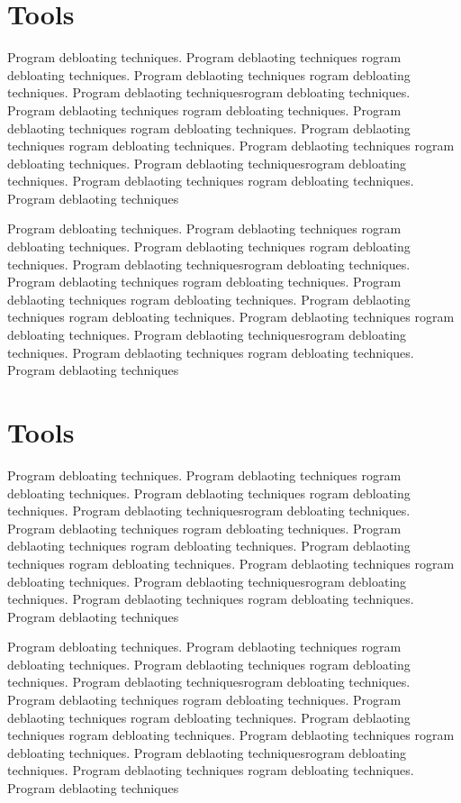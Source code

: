 \documentclass{relatorio}
\begin{document}
\section{Tools}%
\label{Tools}

Program debloating techniques. Program deblaoting techniques rogram debloating techniques. Program deblaoting techniques
rogram debloating techniques. Program deblaoting techniquesrogram debloating techniques. Program deblaoting techniques
rogram debloating techniques. Program deblaoting techniques rogram debloating techniques. Program deblaoting techniques
rogram debloating techniques. Program deblaoting techniques 
rogram debloating techniques. Program deblaoting techniquesrogram debloating techniques. Program deblaoting techniques
rogram debloating techniques. Program deblaoting techniques

Program debloating techniques. Program deblaoting techniques rogram debloating techniques. Program deblaoting techniques
rogram debloating techniques. Program deblaoting techniquesrogram debloating techniques. Program deblaoting techniques
rogram debloating techniques. Program deblaoting techniques rogram debloating techniques. Program deblaoting techniques
rogram debloating techniques. Program deblaoting techniques 
rogram debloating techniques. Program deblaoting techniquesrogram debloating techniques. Program deblaoting techniques
rogram debloating techniques. Program deblaoting techniques

	\section{Tools}%
\label{Tools}

Program debloating techniques. Program deblaoting techniques rogram debloating techniques. Program deblaoting techniques
rogram debloating techniques. Program deblaoting techniquesrogram debloating techniques. Program deblaoting techniques
rogram debloating techniques. Program deblaoting techniques rogram debloating techniques. Program deblaoting techniques
rogram debloating techniques. Program deblaoting techniques 
rogram debloating techniques. Program deblaoting techniquesrogram debloating techniques. Program deblaoting techniques
rogram debloating techniques. Program deblaoting techniques

Program debloating techniques. Program deblaoting techniques rogram debloating techniques. Program deblaoting techniques
rogram debloating techniques. Program deblaoting techniquesrogram debloating techniques. Program deblaoting techniques
rogram debloating techniques. Program deblaoting techniques rogram debloating techniques. Program deblaoting techniques
rogram debloating techniques. Program deblaoting techniques 
rogram debloating techniques. Program deblaoting techniquesrogram debloating techniques. Program deblaoting techniques
rogram debloating techniques. Program deblaoting techniques
\end{document}

